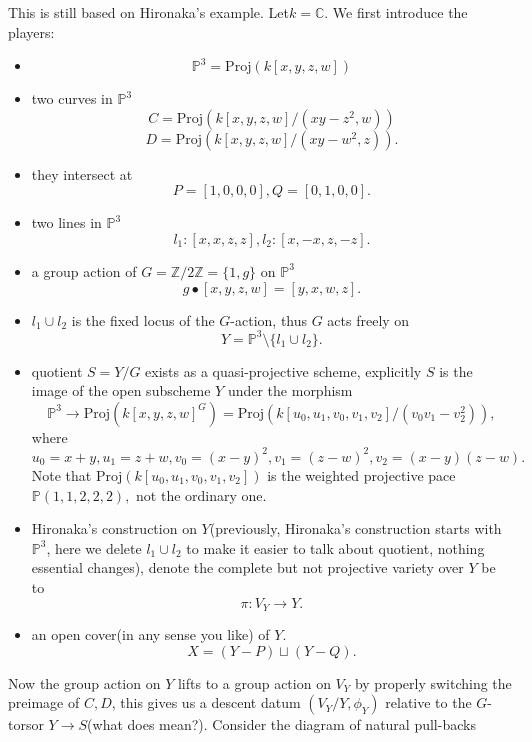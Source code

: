 \documentclass[main.tex]{subfiles}
\begin{document}
\begin{example}

\end{example}
\begin{example}
This is still based on Hironaka's example. Let$k=\mathbb{C}$. We first introduce the players:
\begin{itemize}
\item $$\mathbb{P}^{3}=\mathrm{Proj}(k[x,y,z,w])$$
\item two curves in $\mathbb{P}^{3}$ 
$$C=\mathrm{Proj}(k[x,y,z,w]/(xy-z^{2},w))$$ $$D=\mathrm{Proj}(k[x,y,z,w]/(xy-w^{2},z)).$$ 
\item they intersect at 
$$P=[1,0,0,0], Q=[0,1,0,0].$$
\item two lines in $\mathbb{P}^{3}$
$$l_{1}:[x,x,z,z], l_{2}:[x,-x,z,-z].$$
\item a group action of $G=\mathbb{Z}/2\mathbb{Z}=\{1,g\}$ on $\mathbb{P}^{3}$
$$g\bullet [x,y,z,w]=[y,x,w,z].$$
\item $l_{1}\cup l_{2}$ is the fixed locus of the $G$-action, thus $G$ acts freely on  $$Y=\mathbb{P}^{3}\setminus\{l_{1}\cup l_{2}\}.$$
\item quotient $S=Y/G$ exists as a quasi-projective scheme, explicitly $S$ is the image of the open subscheme $Y$ under the morphism 
$$\mathbb{P}^{3}\rightarrow \mathrm{Proj}(k[x,y,z,w]^{G})=\mathrm{Proj}(k[u_{0},u_{1}, v_{0}, v_{1},v_{2}]/(v_{0}v_{1}-v_{2}^{2})),$$
where 
$$u_{0}=x+y, u_{1}=z+w, v_{0}=(x-y)^{2}, v_{1}=(z-w)^{2}, v_{2}=(x-y)(z-w).$$
Note that $\mathrm{Proj}(k[u_{0},u_{1}, v_{0}, v_{1},v_{2}])$ is the weighted projective pace $\mathbb{P}(1,1,2,2,2),$ not the ordinary one.
\item Hironaka's construction on $Y$(previously, Hironaka's construction starts with $\mathbb{P}^{3}$, here we delete $l_{1}\cup l_{2}$ to make it easier to talk about quotient, nothing essential changes), denote the complete but not projective variety over $Y$ be to 
$$\pi: V_{Y}\rightarrow Y.$$
\item an open cover(in any sense you like) of $Y$.
$$X=(Y-P)\sqcup (Y-Q).$$
\end{itemize}
Now the group action on $Y$ lifts to a group action on $V_{Y}$ by properly switching the preimage of $C, D$, this gives us a descent datum $(V_{Y}/Y, \phi_{Y})$ relative to the $G$-torsor $Y\rightarrow S$(what does mean?). Consider the diagram of natural pull-backs 

\end{example}
\end{document}
